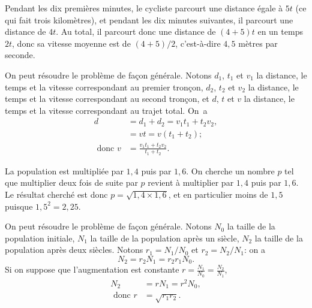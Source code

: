 \begin{Soln}{53}
Pendant les dix premières minutes, le cycliste parcourt une distance égale à $5t$ (ce qui fait trois kilomètres), et pendant les dix minutes suivantes, il parcourt une distance de $4t$. Au total, il parcourt donc une distance de $(4+5)t$ en un temps $2t$, donc sa vitesse moyenne est de $(4+5)/2$, c'est-à-dire $4,5$ mètres par seconde.

On peut résoudre le problème de façon générale.
Notons $d_1$, $t_1$ et $v_1$ la distance, le temps et la vitesse correspondant au premier tronçon, $d_2$, $t_2$ et $v_2$ la distance, le temps et la vitesse correspondant au second tronçon, et $d$, $t$ et $v$ la distance, le temps et la vitesse correspondant au trajet total. On~a
\begin{align*}
d & = d_1 + d_2 = v_1t_1+t_2v_2, \\
& = vt=v(t_1+t_2);\\
\text{ donc } v & = \frac{v_1t_1+t_2v_2}{t_1+t_2}.
\end{align*}
\end{Soln}
\begin{Soln}{54}
La population est multipliée par $1,4$ puis par $1,6$. On cherche un nombre $p$ tel que multiplier deux fois de suite par $p$ revient à multiplier par $1,4$ puis par $1,6$. Le résultat cherché est donc $p=\sqrt{1,4\times 1,6}$, et en particulier moins de $1,5$ puisque $1,5^2=2,25$.

On peut résoudre le problème de façon générale.
Notons $N_0$ la taille de la population initiale, $N_1$ la taille de la population après un siècle, $N_2$ la taille de la population après deux siècles. Notons $r_1=N_1/N_0$ et $r_2=N_2/N_1$: on a
$$N_2=r_2N_1=r_2r_1N_0.$$
Si on suppose que l'augmentation est constante $\displaystyle r=\frac{N_1}{N_0}=\frac{N_2}{N_1}$,
\begin{align*}
N_2 &= rN_1=r^2N_0, \\
\text{ donc } r & =\sqrt{r_1r_2}.
\end{align*}

\end{Soln}
